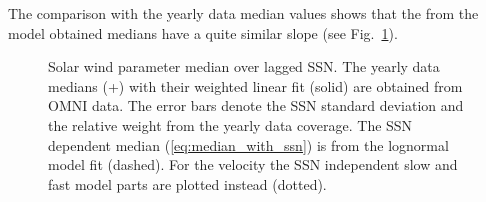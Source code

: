 The comparison with the yearly data median values shows that the from the model obtained medians have a quite similar slope (see Fig.~\ref{fig:OMNI_yearly_BVNTvsSSN}).\\
\begin{figure}
	\caption{Solar wind parameter median over lagged SSN. The yearly data medians (+) with their weighted linear fit (solid) are obtained from OMNI data. The error bars denote the SSN standard deviation and the relative weight from the yearly data coverage. The SSN dependent median (\ref{eq:median_with_ssn}) is from the lognormal model fit (dashed). For the velocity the SSN independent slow and fast model parts are plotted instead (dotted).}
	\label{fig:OMNI_yearly_BVNTvsSSN}
\end{figure}

